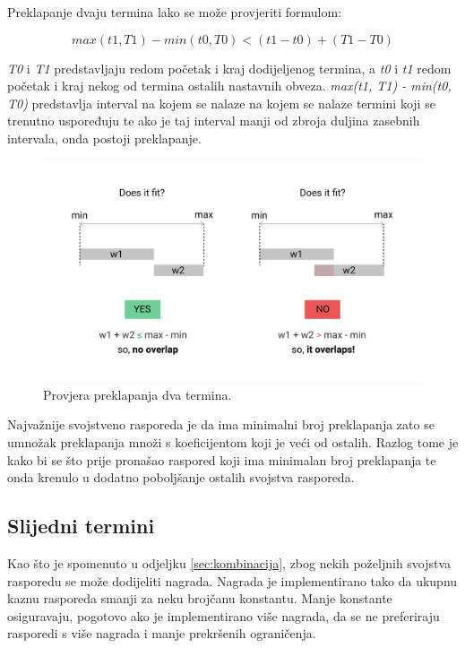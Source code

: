 \documentclass[times, utf8, zavrsni]{fer}
\begin{document}
Preklapanje dvaju termina lako se može provjeriti formulom:

\begin{equation}
max(t1, T1) - min(t0, T0) < (t1 - t0) + (T1  - T0)
\label{eq:preklapanje}
\end{equation}

\emph{T0} i \emph{T1} predstavljaju redom početak i kraj dodijeljenog termina, a \emph{t0} i \emph{t1} redom početak i kraj nekog od termina ostalih nastavnih obveza. \emph{max(t1, T1) - min(t0, T0)} predstavlja interval na kojem se nalaze na kojem se nalaze termini koji se trenutno uspoređuju te ako je taj interval manji od zbroja duljina zasebnih intervala, onda postoji preklapanje.

\begin{figure}[htb]
\centering
\includegraphics[width=15cm]{images/preklapanja.png}
\caption{Provjera preklapanja dva termina.}
\label{fig:preklapanja}
\end{figure}

Najvažnije svojstveno rasporeda je da ima minimalni broj preklapanja zato se umnožak preklapanja množi s koeficijentom koji je veći od ostalih. Razlog tome je kako bi se što prije pronašao raspored koji ima minimalan broj preklapanja te onda krenulo u dodatno poboljšanje ostalih svojstva rasporeda.

\subsection{Slijedni termini}

Kao što je spomenuto u odjeljku \ref{sec:kombinacija}, zbog nekih poželjnih svojstva rasporedu se može dodijeliti nagrada. Nagrada je implementirano tako da ukupnu kaznu rasporeda smanji za neku brojčanu konstantu. Manje konstante osiguravaju, pogotovo ako je implementirano više nagrada, da se ne preferiraju rasporedi s više nagrada i manje prekršenih ograničenja. 
\end{document}
